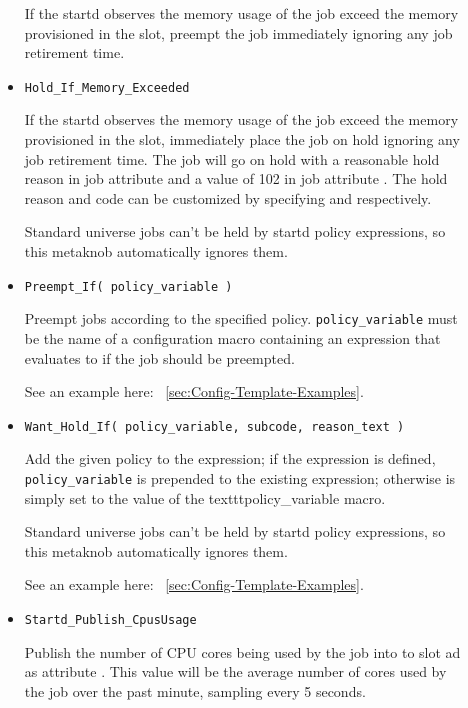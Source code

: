 \begin{description}
\begin{itemize}
	If the startd observes the memory usage of the job exceed
	the memory provisioned in the slot, preempt the job immediately
	ignoring any job retirement time.

	\item \texttt{Hold\_If\_Memory\_Exceeded}

	If the startd observes the memory usage of the job exceed
	the memory provisioned in the slot,
	immediately place the job on hold
	ignoring any job retirement time.
	The job will go on hold with a reasonable
	hold reason in job attribute  and a value of 102 in job
	attribute .  The hold reason and code can be customized by
	specifying  and
	 respectively.

	Standard universe jobs can't be held by startd policy expressions,
	so this metaknob automatically ignores them.

	\item \texttt{Preempt\_If( policy\_variable )}

	Preempt jobs according to the specified policy.
	\texttt{policy\_variable} must be the name of a configuration macro
	containing an expression that evaluates to  if the job
	should be preempted.

	See an example here: ~\ref{sec:Config-Template-Examples}.

	\item \texttt{Want\_Hold\_If( policy\_variable, subcode, reason\_text )}

	Add the given policy to the  expression; if the
	 expression is defined, \texttt{policy\_variable}
	is prepended to the existing expression; otherwise
	 is simply set to the value of the
	texttt{policy\_variable} macro.

	Standard universe jobs can't be held by startd policy expressions,
	so this metaknob automatically ignores them.

	See an example here: ~\ref{sec:Config-Template-Examples}.

	\item \texttt{Startd\_Publish\_CpusUsage}

	Publish the number of CPU cores being used by the job into
	to slot ad as attribute . This value will
	be the average number of cores used by the job over the
	past minute, sampling every 5 seconds.
  \end{itemize}


\end{description}
